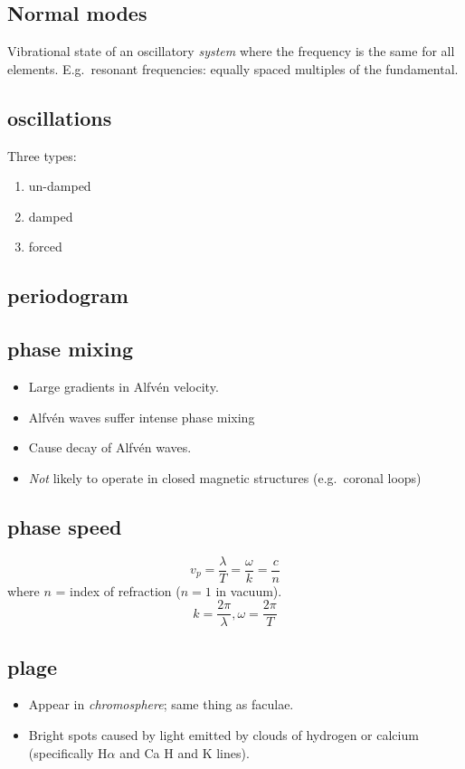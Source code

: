 \documentclass{article}
\begin{document}
\subsection{Normal modes}
Vibrational state of an oscillatory \emph{system} where the frequency
is the same for all elements. E.g.\ resonant frequencies: equally
spaced multiples of the fundamental.

\subsection{oscillations}
Three types:
\begin{enumerate}
    \item un-damped
    \item damped
    \item forced
\end{enumerate}

\subsection{periodogram}
\subsection{phase mixing}
\begin{itemize}
    \item Large gradients in Alfv\'en velocity.
    \item Alfv\'en waves suffer intense phase mixing
    \item Cause decay of Alfv\'en waves.
    \item \emph{Not} likely to operate in closed magnetic structures
        (e.g.\ coronal loops)
\end{itemize}

\subsection{phase speed}
\[
    v_{p} = \frac{\lambda}{T} = \frac{\omega}{k} = \frac{c}{n}
    \]
where $n$ = index of refraction ($n = 1$ in vacuum).
\[
    k = \frac{2\pi}{\lambda}, \omega = \frac{2\pi}{T}
    \]

\subsection{plage}
    \begin{itemize}
        \item Appear in \emph{chromosphere}; same thing as faculae.
        \item Bright spots caused by light emitted by clouds of
            hydrogen or calcium (specifically H$\alpha$ and
            Ca H and K lines).
    \end{itemize}
\end{document}
